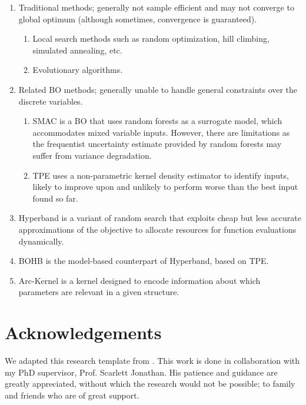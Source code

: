 \documentclass[
    american,a4paper
    ]{scrartcl}
\begin{document}
        \begin{enumerate}
            \item Traditional methods; generally not sample efficient and may not converge to global optimum (although sometimes, convergence is guaranteed).
            \begin{enumerate}
                \item Local search methods such as random optimization, hill climbing, simulated annealing, etc.
                \item Evolutionary algorithms.
            \end{enumerate}
            \item Related BO methods; generally unable to handle general constraints over the discrete variables.
            \begin{enumerate}
                \item SMAC \cite{hutter2011sequential} is a BO that uses random forests as a surrogate model, which accommodates mixed variable inputs. However, there are limitations as the frequentist uncertainty estimate provided by random forests may suffer from variance degradation.
                \item TPE \cite{bergstra2013making} uses a non-parametric kernel density estimator to identify inputs, likely to improve upon and unlikely to perform worse than the best input found so far.
            \end{enumerate}
            \item Hyperband \cite{li2017hyperband} is a variant of random search that exploits cheap but less accurate approximations of the objective to allocate resources for function evaluations dynamically.
            \item BOHB \cite{falkner2018bohb} is the model-based counterpart of Hyperband, based on TPE.
            \item Arc-Kernel \cite{swersky2014raiders} is a kernel designed to encode information about which parameters are relevant in a given structure. 
        \end{enumerate}
      \section*{Acknowledgements}
      We adapted this research template from \cite{Stefan2018}.
      This work is done in collaboration with my PhD supervisor, Prof. Scarlett Jonathan. 
      His patience and guidance are greatly appreciated, without which the research would not be possible; 
      to family and friends who are of great support.
      \newpage
      \printbibliography
    
\end{document}
